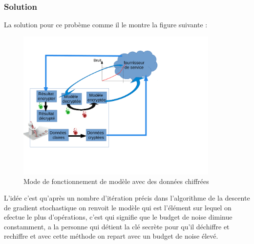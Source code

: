 \documentclass[a4paper,12pt]{article}
\begin{document}
  \subsubsection{Solution}
  La solution pour ce probème comme il le montre la figure suivante :\newline
  \begin{figure}[h!]\begin{center}
    \includegraphics[width=10cm]{SchemaM.pdf}
    \caption{Mode de fonctionnement de modèle avec des données chiffrées}

    \label{fig:loss_linear}
  \end{center}
  \end{figure}
  \newline
 L'idée c'est qu'après un nombre d'itération précis dans l'algorithme de la descente de gradient stochastique on renvoit le modèle qui est l'élément sur lequel on efectue le plus d'opérations, c'est qui signifie que le budget de noise diminue constamment, a la personne qui détient la clé secrète pour qu'il déchiffre et rechiffre et avec cette méthode on repart avec un budget de noise élevé.
\end{document}
